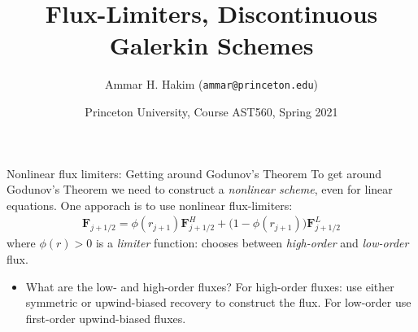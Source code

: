 \documentclass[aspectratio=169]{beamer}
\title[{\tt }]{Flux-Limiters, Discontinuous Galerkin Schemes}%
\author[https://ast560.rtfd.io]%
{Ammar H. Hakim ({\tt ammar@princeton.edu}) \inst{1}}%
\institute[PPPL]
{ \inst{1} Princeton Plasma Physics Laboratory, Princeton, NJ %
}
\date[3/30/2021]{Princeton University, Course AST560, Spring 2021}
\newcommand{\mvec}[1]{\mathbf{#1}}
\begin{document}
\begin{frame}[plain]
  \titlepage
\end{frame}

\begin{frame}{Nonlinear flux limiters: Getting around Godunov's Theorem}
  To get around Godunov's Theorem we need to construct a
  \emph{nonlinear scheme}, even for linear equations. One apporach is
  to use nonlinear flux-limiters:
  \begin{align*}
    \mvec{F}_{j+1/2} = \phi(r_{j+1}) \mvec{F}^H_{j+1/2} + \big(1-\phi(r_{j+1})\big) \mvec{F}^L_{j+1/2}
  \end{align*}
  where $\phi(r)>0$ is a \emph{limiter} function: chooses between
  \emph{high-order} and \emph{low-order} flux.
  \begin{itemize} 
  \item What are the low- and high-order fluxes? For high-order
    fluxes: use either symmetric or upwind-biased recovery to
    construct the flux. For low-order use first-order upwind-biased
    fluxes.
  \end{itemize}
\end{frame}
\end{document}
